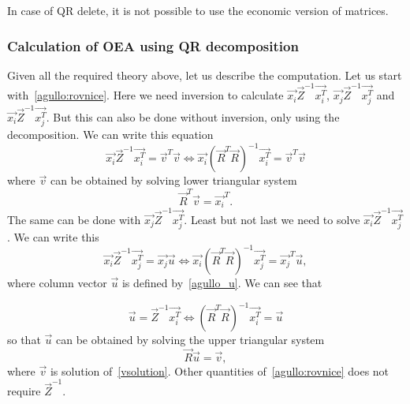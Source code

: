 \begin{note}
In case of QR delete, it is not possible to use the economic version of matrices.
\end{note}







\subsubsection*{Calculation of OEA using QR decomposition}
Given all the required theory above, let us describe the computation. Let us start with~\eqref{agullo:rovnice}. Here we need inversion to calculate 
$\vec{x_i}\vec{Z}^{-1}\vec{x_i^T}$, $\vec{x_j}\vec{Z}^{-1}\vec{x_j^T}$ and $\vec{x_i}\vec{Z}^{-1}\vec{x_j^T}$. But this can also be done without inversion, only using the decomposition. We can write this equation
\begin{equation} \label{solveimi}
    \vec{x_i}\vec{Z}^{-1}\vec{x_i^T} = \vec{v}^T\vec{v}     \iff \vec{x_i}(\vec{R}^T\vec{R})^{-1}\vec{x_i^T} = \vec{v}^T\vec{v}
\end{equation} 
where $\vec{v}$ can be obtained by solving lower triangular system
\begin{equation} \label{vsolution}
    \vec{R}^T\vec{v} = \vec{x_i}^T.
\end{equation} 
The same can be done with  $\vec{x_j}\vec{Z}^{-1}\vec{x_j^T}$. Least but not last we need to solve 
$\vec{x_i}\vec{Z}^{-1}\vec{x_j^T}$. We can write this 
\begin{equation}
    \vec{x_i}\vec{Z}^{-1}\vec{x_j^T} = \vec{x_j}\vec{u}     \iff \vec{x_i}(\vec{R}^T\vec{R})^{-1}\vec{x_j^T} = \vec{x_j}^T\vec{u},
\end{equation} 
where column vector $\vec{u}$ is defined by~\eqref{agullo_u}. We can see that 

\begin{equation}
    \vec{u} = \vec{Z}^{-1}\vec{x_i^T}     \iff (\vec{R}^T\vec{R})^{-1}\vec{x_i^T} = \vec{u}
\end{equation}
so that $\vec{u}$ can be obtained by solving the upper triangular system 
\begin{equation} \label{solve_u_qr}
    \vec{R}\vec{u} = \vec{v},
\end{equation}
where $\vec{v}$ is solution of~\eqref{vsolution}. Other quantities of~\eqref{agullo:rovnice} does not require $\vec{Z}^{-1}$.

